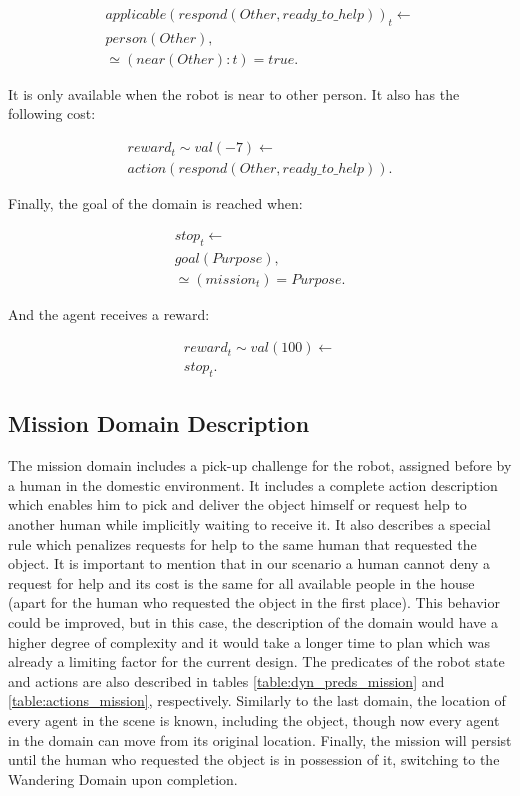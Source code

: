 \begin{align*} 
    applicable(respond(Other, ready\_to\_help))_t \leftarrow \\
    person(Other), \\
	\simeq(near(Other):t) = true.
\end{align*}

It is only available when the robot is near to other person. It also has the following cost:

\begin{align*} 
    reward_t \sim val(-7) \leftarrow \\
	action(respond(Other, ready\_to\_help)).
\end{align*}

Finally, the goal of the domain is reached when:

\begin{align*} 
    stop_t \leftarrow \\
    goal(Purpose), \\
    \simeq(mission_t) = Purpose.
\end{align*}

And the agent receives a reward:

\begin{align*} 
    reward_t \sim val(100) \leftarrow \\
	stop_t.
\end{align*}


\subsection{Mission Domain Description}

The mission domain includes a pick-up challenge for the robot, assigned before by a human
in the domestic environment. It includes a complete action description which enables him
to pick and deliver the object himself or request help to another human while implicitly
waiting to receive it. It also describes a special rule which penalizes requests for help 
to the same human that requested the object. It is important to mention that in our 
scenario a human cannot deny a request for help and its cost is the same for all available 
people in the house (apart for the human who requested the object in the first place). This
behavior could be improved, but in this case, the description of the domain would have a higher
degree of complexity and it would take a longer time to plan which was already a limiting factor for the
current design. The predicates of the robot state and actions are also described in tables
\ref{table:dyn_preds_mission} and \ref{table:actions_mission}, respectively. 
Similarly to the last domain, the location of every agent in the scene is known, including the object, though
now every agent in the domain can move from its original location.
Finally, the mission  will persist until the human who requested the object is in possession of it, 
switching to the Wandering Domain upon completion.

